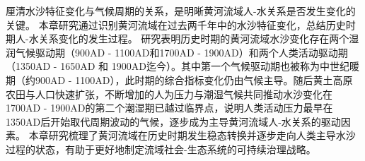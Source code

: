 厘清水沙特征变化与气候周期的关系，是明晰黄河流域人-水关系是否发生变化的关键。
本章研究通过识别黄河流域在过去两千年中的水沙特征变化，总结历史时期人-水关系变化的发生过程。
研究表明历史时期的黄河流域水沙变化存在两个湿润气候驱动期（900AD - 1100AD和1700AD - 1900AD）和两个人类活动驱动期（1350AD - 1650AD 和 1900AD迄今）。其中第一个气候驱动期也被称为中世纪暖期（约900AD - 1100AD），此时期的综合指标变化仍由气候主导。随后黄土高原农田与人口快速扩张，不断增加的人为压力与潮湿气候共同推动水沙变化在1700AD - 1900AD的第二个潮湿期已越过临界点，说明人类活动压力最早在1350AD后开始取代周期波动的气候，逐步成为主导黄河流域人-水关系的驱动因素。
本章研究梳理了黄河流域在历史时期发生稳态转换并逐步走向人类主导水沙过程的状态，有助于更好地制定流域社会-生态系统的可持续治理战略。
